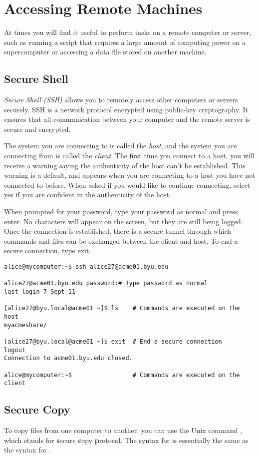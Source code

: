 \section*{Accessing Remote Machines} %
At times you will find it useful to perform tasks on a remote computer or server, such as running a script that requires a large amount of computing power on a supercomputer or accessing a data file stored on another machine.

\subsection*{Secure Shell}
\emph{Secure Shell (SSH)} allows you to remotely access other computers or servers securely.
SSH is a network protocol encrypted using public-key cryptography.
It ensures that all communication between your computer and the remote server is secure and encrypted.

The system you are connecting to is called the \emph{host}, and the system you are connecting from is called the \emph{client}.
The first time you connect to a host, you will receive a warning saying the authenticity of the host can't be established.
This warning is a default, and appears when you are connecting to a host you have not connected to before.
When asked if you would like to continue connecting, select yes if you are confident in the authenticity of the host.

When prompted for your password, type your password as normal and press enter.
No characters will appear on the screen, but they are still being logged.
Once the connection is established, there is a secure tunnel through which commands and files can be exchanged between the client and host.
To end a secure connection, type exit.

\begin{lstlisting}
alice@mycomputer:~$ ssh alice27@acme01.byu.edu

alice27@acme01.byu.edu password:# Type password as normal
last login 7 Sept 11

[alice27@byu.local@acme01 ~]$ ls	# Commands are executed on the host
myacmeshare/

[alice27@byu.local@acme01 ~]$ exit	# End a secure connection
logout
Connection to acme01.byu.edu closed.

alice@mycomputer:~$					# Commands are executed on the client
\end{lstlisting}

\subsection*{Secure Copy} %
To copy files from one computer to another, you can use the Unix command , which stands for \textbf{s}ecure \textbf{c}opy \textbf{p}rotocol.
The syntax for  is essentially the same as the syntax for .

